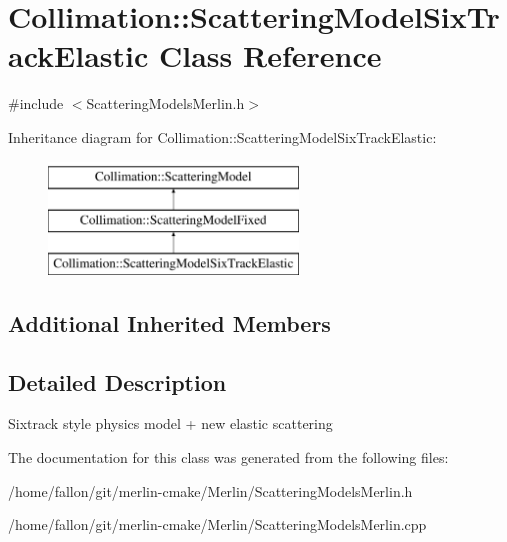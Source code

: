 \hypertarget{classCollimation_1_1ScatteringModelSixTrackElastic}{}\section{Collimation\+:\+:Scattering\+Model\+Six\+Track\+Elastic Class Reference}
\label{classCollimation_1_1ScatteringModelSixTrackElastic}


{\ttfamily \#include $<$Scattering\+Models\+Merlin.\+h$>$}

Inheritance diagram for Collimation\+:\+:Scattering\+Model\+Six\+Track\+Elastic\+:\begin{figure}[H]
\begin{center}
\leavevmode
\includegraphics[height=3.000000cm]{classCollimation_1_1ScatteringModelSixTrackElastic}
\end{center}
\end{figure}
\subsection*{Additional Inherited Members}


\subsection{Detailed Description}
Sixtrack style physics model + new elastic scattering 

The documentation for this class was generated from the following files\+:\begin{DoxyCompactItemize}
\item 
/home/fallon/git/merlin-\/cmake/\+Merlin/Scattering\+Models\+Merlin.\+h\item 
/home/fallon/git/merlin-\/cmake/\+Merlin/Scattering\+Models\+Merlin.\+cpp\end{DoxyCompactItemize}

